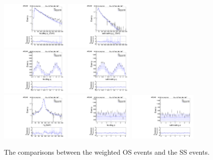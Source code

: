 \begin{figure}
\centering
\includegraphics[width=0.3\textwidth]{data/plot/charge_flip/ReweightPlots/plots_NOchfSF/mc_pt_1.pdf}
\includegraphics[width=0.3\textwidth]{data/plot/charge_flip/ReweightPlots/plots_NOchfSF/mc_pt_2.pdf} \\
\includegraphics[width=0.3\textwidth]{data/plot/charge_flip/ReweightPlots/plots_NOchfSF/mc_eta_1.pdf}
\includegraphics[width=0.3\textwidth]{data/plot/charge_flip/ReweightPlots/plots_NOchfSF/mc_eta_2.pdf} \\
\includegraphics[width=0.3\textwidth]{data/plot/charge_flip/ReweightPlots/plots_NOchfSF/mc_mll.pdf}
\includegraphics[width=0.3\textwidth]{data/plot/charge_flip/ReweightPlots/plots_NOchfSF/mc_phi_1.pdf}
\includegraphics[width=0.3\textwidth]{data/plot/charge_flip/ReweightPlots/plots_NOchfSF/mc_phi_2.pdf}
\caption{The comparisons between the weighted OS events and the SS events.}
\label{fig:charge_flip_MC_validation}
\end{figure}

